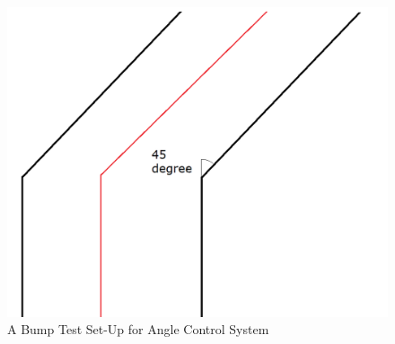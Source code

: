 \documentclass[a4paper,12pt]{article}
\begin{document}
		
		\begin{figure}[H]
			\center
			\setlength{\unitlength}{\textwidth} 
			\includegraphics[width=1\unitlength]{bump_test_ang}
			\caption{\label{fig:bump2} A Bump Test Set-Up for Angle Control System}
		\end{figure}


%



	




\end{document}
